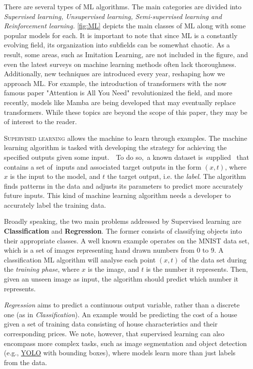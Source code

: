 \documentclass{article}
\begin{document}
There are several types of ML algorithms. The main categories are divided into \textit{Supervised learning, Unsupervised learning, Semi-supervised learning and Reinforcement learning.} \autoref{fig:ML} depicts the main classes of ML along with some popular models for each. It is important to note that since ML is a constantly evolving field, its organization into subfields can be somewhat chaotic. As a result, some areas, such as Imitation Learning, are not included in the figure, and even the latest surveys on machine learning methods often lack thoroughness. Additionally, new techniques are introduced every year, reshaping how we approach ML. For example, the introduction of transformers with the now famous paper "Attention is All You Need" \citep{vaswani2023attention} revolutionized the field, and more recently, models like Mamba \citep{gu2023mamba} are being developed that may eventually replace transformers. While these topics are beyond the scope of this paper, they may be of interest to the reader.

\vspace{4mm}
  \noindent \textsc{Supervised learning} allows the machine to learn through examples. The machine learning algorithm is tasked with developing the strategy for achieving the specified outputs given some input.  To do so, a known dataset is supplied  that contains a set of inputs and associated target outputs in the form $(x, t)$, where $x$ is the input to the model, and $t$ the target output, i.e. the \textit{label}. The algorithm finds patterns in the data and adjusts its parameters to predict more accurately future inputs. This kind of machine learning algorithm needs a developer to accurately label the training data. 

  Broadly speaking, the two main problems addressed by Supervised learning are \textbf{Classification} and \textbf{Regression}. The former consists of classifying objects into their appropriate classes. A well known example operates on the MNIST data set, which is a set of images representing hand drawn numbers from 0 to 9. A classification ML algorithm will analyse each point $(x,t)$ of the data set during the \textit{training phase}, where $x$ is the image, and $t$ is the number it represents. Then, given an unseen image as input, the algorithm should predict which number it represents.

  \textit{Regression} aims to predict a continuous output variable, rather than a discrete one (as in \textit{Classification}). An example would be predicting the cost of a house given a set of training data consisting of house characteristics and their corresponding prices. We note, however, that supervised learning can also encompass more complex tasks, such as image segmentation and object detection (e.g., \href{https://github.com/ultralytics/ultralytics}{YOLO} with bounding boxes), where models learn more than just labels from the data.
\end{document}
